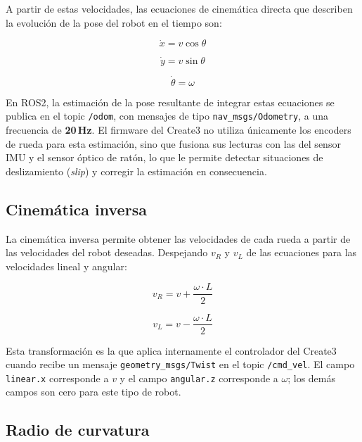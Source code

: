 A partir de estas velocidades, las ecuaciones de cinemática directa que describen la evolución de la pose del robot en el tiempo son:

\begin{equation}
    \dot{x} = v \cos\theta
    \label{eq:xdot}
\end{equation}

\begin{equation}
    \dot{y} = v \sin\theta
    \label{eq:ydot}
\end{equation}

\begin{equation}
    \dot{\theta} = \omega
    \label{eq:thetadot}
\end{equation}

En ROS2, la estimación de la pose resultante de integrar estas ecuaciones se publica en el topic \texttt{/odom}, con mensajes de tipo \texttt{nav\_msgs/Odometry}, a una frecuencia de \textbf{20\,Hz}. El firmware del Create3 no utiliza únicamente los encoders de rueda para esta estimación, sino que fusiona sus lecturas con las del sensor IMU y el sensor óptico de ratón, lo que le permite detectar situaciones de deslizamiento (\textit{slip}) y corregir la estimación en consecuencia.

\subsection{Cinemática inversa}

La cinemática inversa permite obtener las velocidades de cada rueda a partir de las velocidades del robot deseadas. Despejando $v_R$ y $v_L$ de las ecuaciones para las velocidades lineal y angular:

\begin{equation}
    v_R = v + \frac{\omega \cdot L}{2}
    \label{eq:vr}
\end{equation}

\begin{equation}
    v_L = v - \frac{\omega \cdot L}{2}
    \label{eq:vl}
\end{equation}

Esta transformación es la que aplica internamente el controlador del Create3 cuando recibe un mensaje \texttt{geometry\_msgs/Twist} en el topic \texttt{/cmd\_vel}. El campo \texttt{linear.x} corresponde a $v$ y el campo \texttt{angular.z} corresponde a $\omega$; los demás campos son cero para este tipo de robot.

\subsection{Radio de curvatura}

